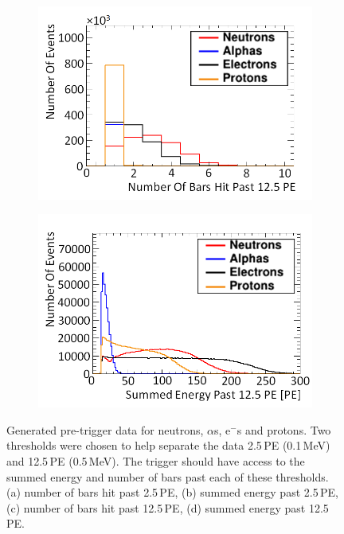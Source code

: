 \begin{figure}[!h]
\begin{subfigure}{.49\textwidth}
  \includegraphics[width=\linewidth]{Chapter4.5/Figs/preTrigNba12.5.png}
  \captionsetup{width=.9\linewidth}
  \caption{}
  \label{subFig:preTrigNba12.5}
\end{subfigure}
\begin{subfigure}{.49\textwidth}
  \centering
  \includegraphics[width=\linewidth]{Chapter4.5/Figs/preTrigSea12.5.png}
  \captionsetup{width=.9\linewidth}
  \caption{}
  \label{subFig:preTrigSea12.5}
\end{subfigure}
\caption{Generated pre-trigger data for neutrons, $\alpha$s, e$^-$s and protons. Two thresholds were chosen to help separate the data 2.5\,PE (0.1\,MeV) and 12.5\,PE (0.5\,MeV). The trigger should have access to the summed energy and number of bars past each of these thresholds. (a) number of bars hit past 2.5\,PE, (b) summed energy past 2.5\,PE, (c) number of bars hit past 12.5\,PE, (d) summed energy past 12.5\,PE.}
\label{fig:preTriggerData}
\end{figure}

